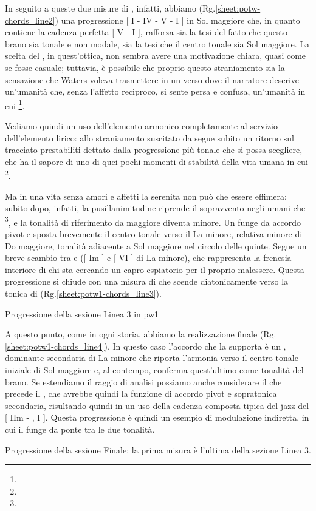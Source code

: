 \documentclass[class=book, crop=false, oneside, 12pt]{standalone}
\begin{document}
    In seguito a queste due misure di , infatti, abbiamo (Rg.\ref{sheet:potw-chords_line2}) una progressione [ I - IV - V - I ] in Sol maggiore che, in quanto contiene la cadenza perfetta [ V - I ], rafforza sia la tesi del fatto che questo brano sia tonale e non modale, sia la tesi che il centro tonale sia Sol maggiore. La scelta del , in quest'ottica, non sembra avere una motivazione chiara, quasi come se fosse casuale; tuttavia, è possibile che proprio questo straniamento sia la sensazione che Waters voleva trasmettere in un verso dove il narratore descrive un'umanità che, senza l'affetto reciproco, si sente persa e confusa, un'umanità in cui \footnote{}.

    Vediamo quindi un uso dell'elemento armonico completamente al servizio dell'elemento lirico: allo straniamento suscitato da  segue subito un ritorno sul tracciato prestabiliti dettato dalla progressione più tonale che si possa scegliere, che ha il sapore di uno di quei pochi momenti di stabilità della vita umana in cui  \footnote{}.

    Ma in una vita senza amori e affetti la serenita non può che essere effimera: subito dopo, infatti, la pusillanimitudine riprende il sopravvento negli umani che \footnote{}, e la tonalità di riferimento da maggiore diventa minore. Un  funge da accordo pivot e sposta brevemente il centro tonale verso il La minore, relativa minore di Do maggiore, tonalità adiacente a Sol maggiore nel circolo delle quinte. Segue un breve scambio tra  e  ([ Im ] e [ \flat VI ] di La minore), che rappresenta la frenesia interiore di chi sta cercando un capro espiatorio per il proprio malessere. Questa progressione si chiude con una misura di  che scende diatonicamente verso la tonica di  (Rg.\ref{sheet:potw1-chords_line3}).

    \begin{sheet}{Progressione della sezione Linea 3 in \acrshort{pw1}}
        \label{sheet:potw1-chords_line3}
    \end{sheet}

    A questo punto, come in ogni storia, abbiamo la realizzazione finale (Rg.\ref{sheet:potw1-chords_line4}). In questo caso l'accordo che la supporta è un , dominante secondaria di La minore che riporta l'armonia verso il centro tonale iniziale di Sol maggiore e, al contempo, conferma quest'ultimo come tonalità del brano. Se estendiamo il raggio di analisi possiamo anche considerare il  che precede il , che avrebbe quindi la funzione di accordo pivot e sopratonica secondaria, risultando quindi in un uso della cadenza composta tipica del jazz del [ IIm - , I ]. Questa progressione è quindi un esempio di modulazione indiretta, in cui il  funge da ponte tra le due tonalità.

    \begin{sheet}{Progressione della sezione Finale; la prima misura è l'ultima della sezione Linea 3.}
        \label{sheet:potw1-chords_line4}
    \end{sheet}
\end{document}
